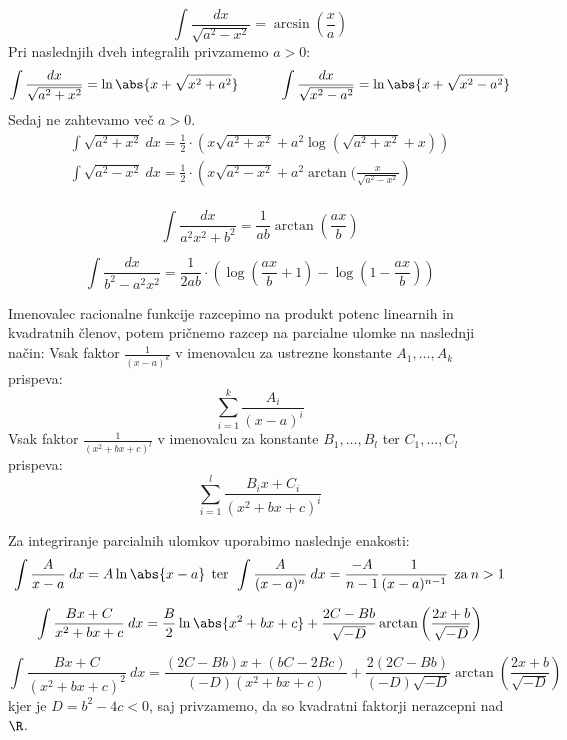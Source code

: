 \documentclass[12pt, a4paper, unicode]{article}
\begin{document}
\begin{naloga}[Koreni]
\[\int \frac{dx}{\sqrt{a^2-x^2}} = \arcsin{\left(\frac{x}{a}\right)}\]
Pri naslednjih dveh integralih privzamemo $a>0$:
\begin{gather*}
\int \frac{dx}{\sqrt{a^2+x^2}} = \ln{\abs{x + \sqrt{x^2+a^2}}} \quad \quad \quad \int \frac{dx}{\sqrt{x^2-a^2}} = \ln{\abs{x+ \sqrt{x^2-a^2}}} \\
\end{gather*}
Sedaj ne zahtevamo več $a>0$.
\begin{gather*}
\int \sqrt{a^2 + x^2} \: dx = \frac{1}{2} \cdot \left(x \sqrt{a^2 + x^2} + a^2 \log(\sqrt{a^2 + x^2} + x)\right)\\
\int \sqrt{a^2 - x^2} \: dx = \frac{1}{2} \cdot \left( x \sqrt{a^2 - x^2} + a^2 \arctan(\frac{x}{\sqrt{a^2 - x^2}}\right)\\
\end{gather*}
\end{naloga}
\begin{naloga}
\[
\int \frac{dx}{a^2x^2+b^2} = \frac{1}{ab}\arctan\left(\frac{ax}{b}\right)
\]

\[
\int \frac{dx}{b^2-a^2x^2} = \frac{1}{2ab} \cdot \left(\log\left(\frac{ax}{b} + 1\right) - \log\left(1 - \frac{ax}{b}\right)\right)
\]
\end{naloga}

\begin{naloga}
Imenovalec racionalne funkcije razcepimo na produkt potenc linearnih in kvadratnih členov, potem pričnemo razcep na parcialne ulomke na naslednji način: \newline Vsak faktor $\frac{1}{(x-a)^{k}}$ v imenovalcu za ustrezne konstante $A_1, \dots, A_k$ prispeva:
\[\sum_{i=1}^{k} \frac{A_i}{(x-a)^i}\]
Vsak faktor $\frac{1}{(x^2+bx+c)^{l}}$ v imenovalcu za konstante $B_1, \dots, B_l$ ter $C_1, \dots, C_l$ prispeva:
\[\sum_{i=1}^{l} \frac{B_i x + C_i}{(x^2 + bx +c)^i}\]

Za integriranje parcialnih ulomkov uporabimo naslednje enakosti:
\[
\int \frac{A}{x-a} \: dx = A \ln{\abs{x-a}} \: \: \text{ter} \: \: \int \frac{A}{(x-a)^n} \: dx = \frac{-A}{n-1} \frac{1}{(x-a)^{n-1}} \: \: \text{za} \: n > 1
\]

\[
\int \frac{Bx+C}{x^2+bx+c} \: dx = \frac{B}{2} \ln{\abs{x^2+bx+c}} + \frac{2C-Bb}{\sqrt{-D}}\arctan\left(\frac{2x+b}{\sqrt{-D}}\right)
\]

\[
\int \frac{Bx+C}{(x^2+bx+c)^2} \: dx = \frac{(2C-Bb)x+(bC-2Bc)}{(-D)(x^2+bx+c)} + \frac{2(2C-Bb)}{(-D)\sqrt{-D}}\arctan\left(\frac{2x+b}{\sqrt{-D}}\right)
\]
\newline
kjer je $D = b^2-4c < 0$, saj privzamemo, da so kvadratni faktorji nerazcepni nad $\R$.
\end{naloga}
\end{document}
